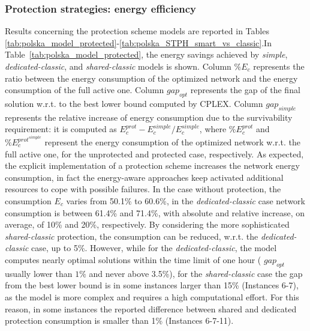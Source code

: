 \documentclass[final,5p,times,twocolumn]{elsarticle}
\begin{document}
\subsubsection{Protection strategies: energy efficiency}
Results concerning the protection scheme models are reported in Tables \ref{tab:polska_model_protected}-\ref{tab:polska_STPH_smart_vs_classic}.In Table~\ref{tab:polska_model_protected}, the energy savings achieved by \textit{simple}, \textit{dedicated-classic}, and \textit{shared-classic} models is shown.  Column $\%E_c$ represents the ratio between the energy consumption of the optimized network and the energy consumption of the full active one. Column $gap_{opt}$ represents the gap of the final solution w.r.t. to the best lower bound computed by CPLEX. Column $gap_{simple}$ represents the relative increase of energy consumption due to the survivability requirement: it is computed as $E_c^{prot}-E_c^{simple}/E_c^{simple}$, where $\%E_c^{prot}$  and $\%E_c^{prot^{simple}}$ represent the energy consumption of the optimized network w.r.t. the full active one, for the unprotected and protected case, respectively.    
  As expected, the explicit implementation of a protection scheme increases the network energy consumption, in fact the energy-aware approaches keep activated additional resources to cope with possible failures. In the case without protection, the consumption $E_c$ varies from 50.1\% to 60.6\%, in the \textit{dedicated-classic} case network consumption is between 61.4\% and 71.4\%, with absolute and relative increase, on average, of 10\% and 20\%, respectively. By considering the more sophisticated \textit{shared-classic} protection, the consumption can be reduced, w.r.t. the \textit{dedicated-classic} case, up to 5\%. However, while for the \textit{dedicated-classic}, the model computes nearly optimal solutions within the time limit of one hour ( $gap_{opt}$ usually lower than $1\%$ and never above 3.5\%), for the \textit{shared-classic} case the gap from the best lower bound is in some instances larger than 15\% (Instances 6-7), as the model is more complex and requires a high computational effort. For this reason, in some instances the reported difference between shared and dedicated protection consumption is smaller than 1\% (Instances 6-7-11). 
  
\end{document}
